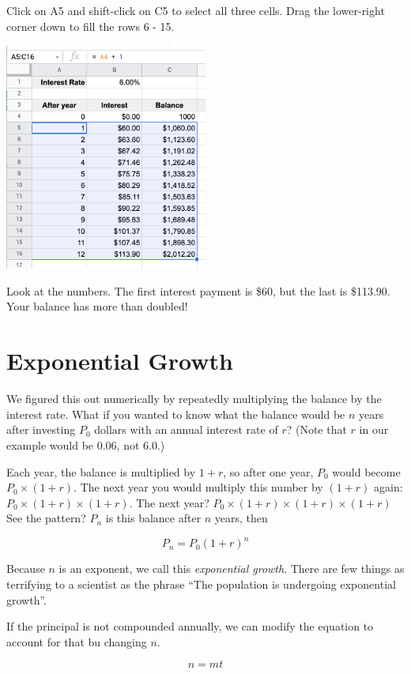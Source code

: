 Click on A5 and shift-click on C5 to select all three cells. Drag the
lower-right corner down to fill the rows 6 - 15.

\includegraphics[width=0.5\textwidth]{CopiedCellsInterest.png}

Look at the numbers.  The first interest payment is \$60, but the last
is \$113.90. Your balance has more than doubled!

\section{Exponential Growth}

We figured this out numerically by repeatedly multiplying the balance
by the interest rate. What if you wanted to know what the balance
would be $n$ years after investing $P_0$ dollars with an annual interest
rate of $r$? (Note that $r$ in our example would be 0.06, not 6.0.)

Each year, the balance is multiplied by $1 + r$, so after one year,
$P_0$ would become $P_0 \times (1 + r)$.  The next year you would multiply
this number by $(1 + r)$ again: $P_0 \times (1 + r) \times (1 + r)$. The
next year? $P_0 \times (1 + r) \times (1 + r) \times (1 + r)$ See the
pattern? $P_n$ is this balance after $n$ years, then 

$$P_n = P_0 (1+r)^n$$

Because $n$ is an exponent, we call this \textit{exponential growth}.
There are few things as terrifying to a scientist as
the phrase ``The population is undergoing exponential growth''.

If the principal is not compounded annually, we can modify the equation to account for that bu changing $n$.

$$n = m t$$

